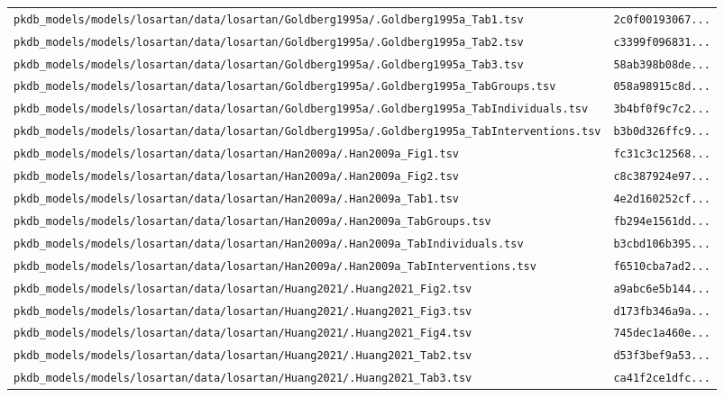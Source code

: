 \begin{longtable}{ll}
\texttt{pkdb\_models/models/losartan/data/losartan/Goldberg1995a/.Goldberg1995a\_Tab1.tsv} & \texttt{2c0f00193067...} \\
\texttt{pkdb\_models/models/losartan/data/losartan/Goldberg1995a/.Goldberg1995a\_Tab2.tsv} & \texttt{c3399f096831...} \\
\texttt{pkdb\_models/models/losartan/data/losartan/Goldberg1995a/.Goldberg1995a\_Tab3.tsv} & \texttt{58ab398b08de...} \\
\texttt{pkdb\_models/models/losartan/data/losartan/Goldberg1995a/.Goldberg1995a\_TabGroups.tsv} & \texttt{058a98915c8d...} \\
\texttt{pkdb\_models/models/losartan/data/losartan/Goldberg1995a/.Goldberg1995a\_TabIndividuals.tsv} & \texttt{3b4bf0f9c7c2...} \\
\texttt{pkdb\_models/models/losartan/data/losartan/Goldberg1995a/.Goldberg1995a\_TabInterventions.tsv} & \texttt{b3b0d326ffc9...} \\
\texttt{pkdb\_models/models/losartan/data/losartan/Han2009a/.Han2009a\_Fig1.tsv} & \texttt{fc31c3c12568...} \\
\texttt{pkdb\_models/models/losartan/data/losartan/Han2009a/.Han2009a\_Fig2.tsv} & \texttt{c8c387924e97...} \\
\texttt{pkdb\_models/models/losartan/data/losartan/Han2009a/.Han2009a\_Tab1.tsv} & \texttt{4e2d160252cf...} \\
\texttt{pkdb\_models/models/losartan/data/losartan/Han2009a/.Han2009a\_TabGroups.tsv} & \texttt{fb294e1561dd...} \\
\texttt{pkdb\_models/models/losartan/data/losartan/Han2009a/.Han2009a\_TabIndividuals.tsv} & \texttt{b3cbd106b395...} \\
\texttt{pkdb\_models/models/losartan/data/losartan/Han2009a/.Han2009a\_TabInterventions.tsv} & \texttt{f6510cba7ad2...} \\
\texttt{pkdb\_models/models/losartan/data/losartan/Huang2021/.Huang2021\_Fig2.tsv} & \texttt{a9abc6e5b144...} \\
\texttt{pkdb\_models/models/losartan/data/losartan/Huang2021/.Huang2021\_Fig3.tsv} & \texttt{d173fb346a9a...} \\
\texttt{pkdb\_models/models/losartan/data/losartan/Huang2021/.Huang2021\_Fig4.tsv} & \texttt{745dec1a460e...} \\
\texttt{pkdb\_models/models/losartan/data/losartan/Huang2021/.Huang2021\_Tab2.tsv} & \texttt{d53f3bef9a53...} \\
\texttt{pkdb\_models/models/losartan/data/losartan/Huang2021/.Huang2021\_Tab3.tsv} & \texttt{ca41f2ce1dfc...} \\

\end{longtable}
